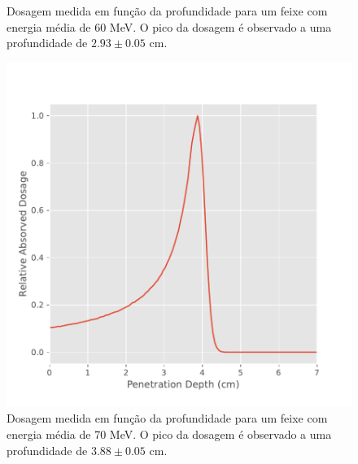 \documentclass[a4paper, 12pt]{article} %
\begin{document}
\begin{figure}[H]
\begin{minipage}[r]{.49\linewidth}
			\caption{Dosagem medida em função da profundidade para um feixe com energia média de 60 MeV. O pico da dosagem é observado a uma profundidade de $2.93 \pm 0.05$ cm.}
			\label{fig:bragg_peak60}
		\end{minipage}
	\end{figure}
	\begin{figure}[H]
		\begin{minipage}[r]{.49\linewidth}
			\centering
			\includegraphics[width=\linewidth]{bragg_peak_70mev.pdf}
			\caption{Dosagem medida em função da profundidade para um feixe com energia média de 70 MeV. O pico da dosagem é observado a uma profundidade de $3.88 \pm 0.05$ cm.}
			\label{fig:bragg_peak70}
		\end{minipage}
		\hspace{.01\linewidth}
		\begin{minipage}[r]{.49\linewidth}
			\centering

\end{minipage}
\end{figure}
\end{document}
